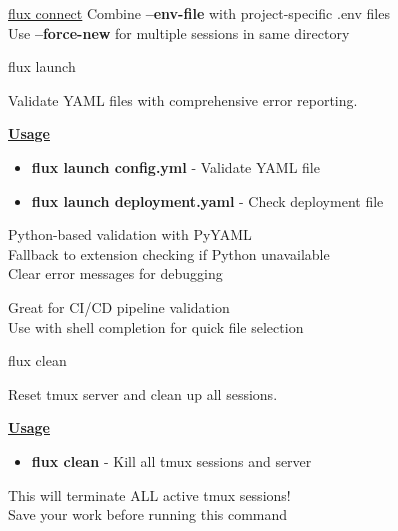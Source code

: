 \documentclass[10pt,a4paper]{article}
\begin{document}
\begin{multicols}{3}
\begin{textbox}{\href{https://github.com/lotape6/flux-capacitor}{flux connect}}
Combine \textbf{--env-file} with project-specific .env files\\

Use \textbf{--force-new} for multiple sessions in same directory\\

\end{textbox}

\begin{textbox}{flux launch}

Validate YAML files with comprehensive error reporting.

\underline{\textbf{Usage}}
\begin{itemize}
    \item \textbf{flux launch config.yml} - Validate YAML file
    \item \textbf{flux launch deployment.yaml} - Check deployment file
\end{itemize}


Python-based validation with PyYAML\\

Fallback to extension checking if Python unavailable\\

Clear error messages for debugging\\


Great for CI/CD pipeline validation\\

Use with shell completion for quick file selection\\

\end{textbox}

\begin{textbox}{flux clean}

Reset tmux server and clean up all sessions.

\underline{\textbf{Usage}}
\begin{itemize}
    \item \textbf{flux clean} - Kill all tmux sessions and server
\end{itemize}


This will terminate ALL active tmux sessions!\\

Save your work before running this command\\


\end{textbox}
\end{multicols}
\end{document}
